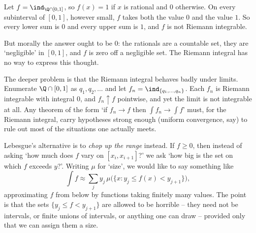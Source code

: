 \begin{example}
	Let $f = \ind_{\Q \cap [0,1]}$, so $f(x) = 1$ if $x$ is rational and $0$ otherwise. On every subinterval of $[0,1]$, however small, $f$ takes both the value $0$ and the value $1$. So every lower sum is $0$ and every upper sum is $1$, and $f$ is not Riemann integrable.

	But morally the answer ought to be $0$: the rationals are a countable set, they are `negligible' in $[0,1]$, and $f$ is zero off a negligible set. The Riemann integral has no way to express this thought.
\end{example}

The deeper problem is that the Riemann integral behaves badly under limits. Enumerate $\Q \cap [0,1]$ as $q_1, q_2, \dots$ and let $f_n = \ind_{\{q_1,\dots,q_n\}}$. Each $f_n$ is Riemann integrable with integral $0$, and $f_n \uparrow f$ pointwise, and yet the limit is not integrable at all. Any theorem of the form `if $f_n \to f$ then $\int f_n \to \int f$' must, for the Riemann integral, carry hypotheses strong enough (uniform convergence, say) to rule out most of the situations one actually meets.

Lebesgue's alternative is to \emph{chop up the range} instead. If $f \geq 0$, then instead of asking `how much does $f$ vary on $[x_i, x_{i+1}]$?' we ask `how big is the set on which $f$ exceeds $y$?'. Writing $\mu$ for `size', we would like to say something like
$$
\int f \approx \sum_j y_j \, \mu\big( \{ x : y_j \leq f(x) < y_{j+1} \} \big),
$$
approximating $f$ from below by functions taking finitely many values. The point is that the sets $\{y_j \leq f < y_{j+1}\}$ are allowed to be horrible -- they need not be intervals, or finite unions of intervals, or anything one can draw -- provided only that we can assign them a size.

